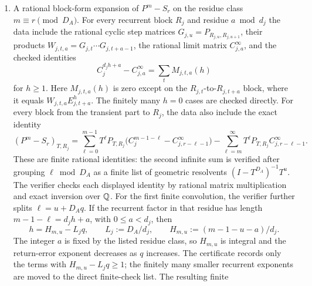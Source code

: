 \begin{theorem}
\begin{enumerate}[label=\textup{(\roman*)}]
    checks, using the same isolating rectangles and rational interval
    arithmetic, that every rectangle lies strictly inside the circle
    \(|z|=\gamma_A\) and supplies a positive rational distance
    \(\Delta_\xi\) from the rectangle to that circle. Therefore
    \[
      |\det(zI-A)|\ge \prod_{\xi}\Delta_\xi=:\delta_A
      \qquad(|z|=\gamma_A),
    \]
    with roots counted with algebraic multiplicity. The verifier also
    checks the elementary coefficient bound
    \[
      \|\operatorname{adj}(zI-A)\|_\infty\le U_A,
    \]
    and hence that \(\|A^n\|_\infty\le L_A\gamma_A^n\) for all
    \(n\ge0\).
    \item A rational block-form expansion of \(P^m-S_r\) on the residue
    class \(m\equiv r\pmod {D_A}\). For every recurrent block \(R_j\)
    and residue \(a\bmod d_j\) the data include the rational cyclic step
    matrices \(G_{j,u}=P_{R_{j,u},R_{j,u+1}}\), their products
    \(W_{j,t,a}=G_{j,t}\cdots G_{j,t+a-1}\), the rational limit matrix
    \(C_{j,a}^{\infty}\), and the checked identities
    \[
      C_j^{d_jh+a}-C_{j,a}^{\infty}
      =
      \sum_t M_{j,t,a}(h)
    \]
    for \(h\ge1\). Here \(M_{j,t,a}(h)\) is zero except on the
    \(R_{j,t}\)-to-\(R_{j,t+a}\) block, where it equals
    \(W_{j,t,a}E_{j,t+a}^h\). The finitely many \(h=0\) cases are
    checked directly. For every block from the transient part to \(R_j\),
    the data also include the exact identity
    \[
      (P^m-S_r)_{T,R_j}
      =
      \sum_{\ell=0}^{m-1}
        T^\ell P_{T,R_j}
        \bigl(C_j^{m-1-\ell}-C_{j,r-\ell-1}^{\infty}\bigr)
      -
      \sum_{\ell=m}^{\infty}
        T^\ell P_{T,R_j}C_{j,r-\ell-1}^{\infty}.
    \]
    These are finite rational identities: the second infinite sum is
    verified after grouping \(\ell\bmod D_A\) as a finite list of
    geometric resolvents \((I-T^{D_A})^{-1}T^u\). The verifier checks
    each displayed identity by rational matrix multiplication and exact
    inversion over \(\mathbb{Q}\). For the first finite convolution, the
    verifier further splits \(\ell=u+D_Aq\). If the recurrent factor in
    that residue has length \(m-1-\ell=d_jh+a\), with
    \(0\le a<d_j\), then
    \[
      h=H_{m,u}-L_jq,\qquad
      L_j:=D_A/d_j,\qquad
      H_{m,u}:=(m-1-u-a)/d_j .
    \]
    The integer \(a\) is fixed by the listed residue class, so
    \(H_{m,u}\) is integral and the return-error exponent decreases as
    \(q\) increases. The certificate records only the terms with
    \(H_{m,u}-L_jq\ge1\); the finitely many smaller recurrent exponents
    are moved to the direct finite-check list. The resulting finite

\end{enumerate}
\end{theorem}
